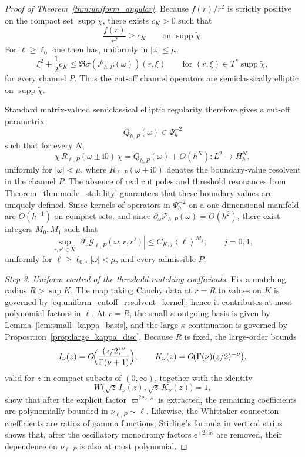\documentclass[12pt]{article}
\numberwithin{equation}{section}
\theoremstyle{plain}
\theoremstyle{definition}
\theoremstyle{remark}
\newcommand{\ii}{\mathrm i}
\newcommand{\ee}{\mathrm e}
\newcommand{\cG}{\mathcal G}
\newcommand{\om}{\omega}
\newcommand{\vp}{\varpi}
\newcommand{\kap}{\kappa}
\newcommand{\angles}[1]{\left\langle #1 \right\rangle}
\newcommand{\abs}[1]{\left|#1\right|}
\begin{document}
\begin{proof}[Proof of Theorem~\ref{thm:uniform_angular}]
Because $f(r)/r^2$ is strictly positive on the compact set $\operatorname{supp}\widetilde\chi$, there exists $c_K>0$ such that
\[
   \frac{f(r)}{r^2}\ge c_K
   \qquad\text{on }\operatorname{supp}\widetilde\chi.
\]
For $\ell\ge\ell_0$ one then has, uniformly in $\abs{\om}\le\mu$,
\begin{equation}\label{eq:uniform_angular_symbol_lb}
   \xi^2+\frac12c_K
   \le
   \Re\sigma(\mathcal P_{h,P}(\om))(r,\xi)
   \qquad
   \text{for }(r,\xi)\in T^*\operatorname{supp}\widetilde\chi,
\end{equation}
for every channel $P$.  Thus the cut-off channel operators are semiclassically elliptic on $\operatorname{supp}\widetilde\chi$.

Standard matrix-valued semiclassical elliptic regularity therefore gives a cut-off parametrix
\[
   Q_{h,P}(\om)\in\Psi_h^{-2}
\]
such that for every $N$,
\begin{equation}\label{eq:uniform_angular_parametrix}
   \chi\,R_{\ell,P}(\om\pm\ii0)\,\chi
   =
   Q_{h,P}(\om)
   +O(h^N):L^2\to H_h^N,
\end{equation}
uniformly for $\abs{\om}<\mu$, where $R_{\ell,P}(\om\pm\ii0)$ denotes the boundary-value resolvent in the channel $P$.  The absence of real cut poles and threshold resonances from Theorem~\ref{thm:mode_stability} guarantees that these boundary values are uniquely defined.  Since kernels of operators in $\Psi_h^{-2}$ on a one-dimensional manifold are $O(h^{-1})$ on compact sets, and since $\partial_\om\mathcal P_{h,P}(\om)=O(h^2)$, there exist integers $M_0,M_1$ such that
\begin{equation}\label{eq:uniform_cutoff_resolvent_kernel}
   \sup_{r,r'\in K}
   \abs{\partial_\om^j\cG_{\ell,P}(\om;r,r')}
   \le
   C_{K,j}\angles{\ell}^{M_j},
   \qquad j=0,1,
\end{equation}
uniformly for $\ell\ge\ell_0$, $\abs{\om}<\mu$, and every admissible $P$.

\smallskip
\noindent\textit{Step 3. Uniform control of the threshold matching coefficients.}
Fix a matching radius $R>\sup K$.  The map taking Cauchy data at $r=R$ to values on $K$ is governed by \eqref{eq:uniform_cutoff_resolvent_kernel}; hence it contributes at most polynomial factors in $\ell$.  At $r=R$, the small-$\kap$ outgoing basis is given by Lemma~\ref{lem:small_kappa_basis}, and the large-$\kap$ continuation is governed by Proposition~\ref{prop:large_kappa_disc}.  Because $R$ is fixed, the large-order bounds
\[
   I_\nu(z)=O\!\Bigl(\frac{(z/2)^\nu}{\Gamma(\nu+1)}\Bigr),
   \qquad
   K_\nu(z)=O\!\bigl(\Gamma(\nu)(z/2)^{-\nu}\bigr),
\]
valid for $z$ in compact subsets of $(0,\infty)$, together with the identity
\[
   W\bigl(\sqrt z\,I_\nu(z),\sqrt z\,K_\nu(z)\bigr)=1,
\]
show that after the explicit factor $\vp^{2\nu_{\ell,P}}$ is extracted, the remaining coefficients are polynomially bounded in $\nu_{\ell,P}\sim \ell$.  Likewise, the Whittaker connection coefficients are ratios of gamma functions; Stirling's formula in vertical strips shows that, after the oscillatory monodromy factors $\ee^{\pm2\pi\ii\kap}$ are removed, their dependence on $\nu_{\ell,P}$ is also at most polynomial.


\end{proof}
\end{document}

